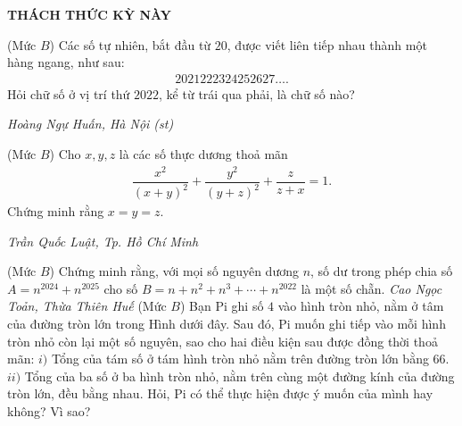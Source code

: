 \begin{center}
	\vspace*{-5pt}
	\textbf{\color{thachthuctoanhoc}\color{thachthuctoanhoc}THÁCH THỨC KỲ NÀY}
	\vspace*{-5pt}
\end{center}
\begin{multicols}{2}
	\setlength{\abovedisplayskip}{4pt}
	\setlength{\belowdisplayskip}{4pt}
	{}
	(Mức $B$) Các số tự nhiên, bắt đầu từ $20$, được viết liên tiếp nhau thành một hàng ngang, như sau:
	\begin{align*}
		2021222324252627\ldots.
	\end{align*}
	Hỏi chữ số ở vị trí thứ $2022$, kể từ trái qua phải, là chữ số nào?
	\begin{flushright}
		\textit{Hoàng Ngự Huấn, Hà Nội (st)}
	\end{flushright}
	{}
	(Mức $B$) Cho $x,y,z$ là các số thực dương thoả mãn 
	\begin{align*}
		\dfrac{x^2}{(x+y)^2}+\dfrac{y^2}{(y+z)^2}+\dfrac z{z+x}=1.
	\end{align*}
	Chứng minh rằng $x=y=z$. 
	\begin{flushright}
		\textit{Trần Quốc Luật, Tp. Hồ Chí Minh}
	\end{flushright}
	{}
	(Mức $B$) Chứng minh rằng, với mọi số nguyên dương $n$, số dư trong phép chia số $A=n^{2024}+n^{2025}$  cho số $B=n+n^2+n^3+\cdots+n^{2022}$ là một số chẵn. 
	\vskip 0.05cm
	\hfill	\textit{Cao Ngọc Toản, Thừa Thiên Huế}
	\vskip 0.05cm
	{}
	(Mức $B$) Bạn Pi ghi số $4$ vào hình tròn nhỏ, nằm ở tâm của đường tròn lớn trong Hình dưới đây. Sau đó, Pi muốn ghi tiếp vào mỗi hình tròn nhỏ còn lại một số nguyên, sao cho hai điều kiện sau được đồng thời thoả mãn: 
	\vskip 0.05cm
	$i)$ Tổng của tám số ở tám hình tròn nhỏ nằm trên đường tròn lớn bằng $66$. 
	\vskip 0.05cm
	$ii)$ Tổng của ba số ở ba hình tròn nhỏ, nằm trên cùng một đường kính của đường tròn lớn, đều bằng nhau. 
	\vskip 0.05cm
	Hỏi, Pi có thể thực hiện được ý muốn của mình hay không? Vì sao?
	\begin{figure}[H]
		\centering
		\vspace*{-5pt}
		\captionsetup{labelformat= empty, justification=centering}

\end{figure}
\end{multicols}
